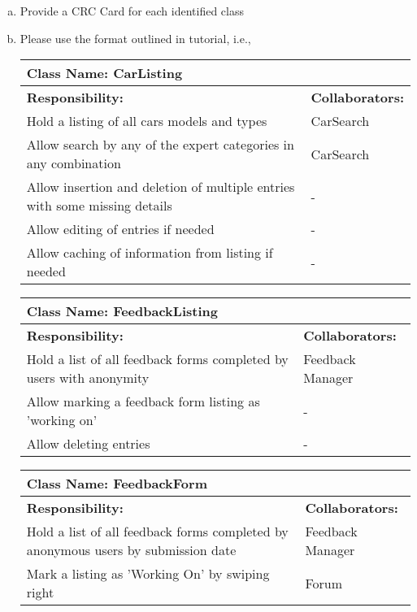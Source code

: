 \documentclass[12pt]{article}
\begin{document}
\begin{enumerate}[a)]
	\item Provide a CRC Card for each identified class
	\item Please use the format outlined in tutorial, i.e., 
	\begin{table}[ht]
		\centering
		\begin{tabular}{|p{5cm}|p{5cm}|}
		\hline 
		 \multicolumn{2}{|l|}{\textbf{Class Name:} CarListing} \\
		\hline
		\textbf{Responsibility:} & \textbf{Collaborators:} \\
		\hline
		Hold a listing of all cars models and types & CarSearch\\
		Allow search by any of the expert categories in any combination & CarSearch \\
		Allow insertion and deletion of multiple entries with some missing details & -\\
		Allow editing of entries if needed & - \\
		Allow caching of information from listing if needed & - \\
		\hline
		\end{tabular}
	\end{table}
	\begin{table}[ht]
		\centering
		\begin{tabular}{|p{5cm}|p{5cm}|}
		\hline 
		 \multicolumn{2}{|l|}{\textbf{Class Name:} FeedbackListing} \\
		\hline
		\textbf{Responsibility:} & \textbf{Collaborators:} \\
		\hline
		Hold a list of all feedback forms completed by users with anonymity & Feedback Manager\\
	    Allow marking a feedback form listing as 'working on' & - \\
	    Allow deleting entries & - \\
		\hline
		\end{tabular}
	\end{table}
	\begin{table}[ht]
		\centering
		\begin{tabular}{|p{5cm}|p{5cm}|}
		\hline 
		 \multicolumn{2}{|l|}{\textbf{Class Name:} FeedbackForm} \\
		\hline
		\textbf{Responsibility:} & \textbf{Collaborators:} \\
		\hline
		Hold a list of all feedback forms completed by anonymous users by submission date & Feedback Manager\\
	    Mark a listing as 'Working On' by swiping right & Forum\\

\end{tabular}
\end{table}
\end{enumerate}
\end{document}
